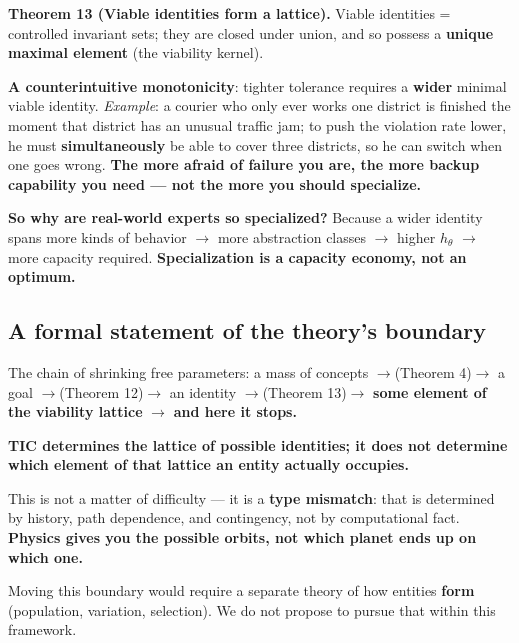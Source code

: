 \documentclass[11pt]{article}
\renewenvironment{quote}
  {\def\FrameCommand{{\color{gray!60}\vrule width 2pt}\hspace{8pt}}%
   \MakeFramed{\advance\hsize-\width \FrameRestore}\begin{itshape}}
  {\end{itshape}\endMakeFramed}
\begin{document}
\begin{quote}
\textbf{Theorem 13 (Viable identities form a lattice).} Viable identities = controlled invariant sets; they are closed under union, and so possess a \textbf{unique maximal element} (the viability kernel).

\textbf{A counterintuitive monotonicity}: tighter tolerance requires a \textbf{wider} minimal viable identity. \emph{Example}: a courier who only ever works one district is finished the moment that district has an unusual traffic jam; to push the violation rate lower, he must \textbf{simultaneously} be able to cover three districts, so he can switch when one goes wrong. \textbf{The more afraid of failure you are, the more backup capability you need --- not the more you should specialize.}

\textbf{So why are real-world experts so specialized?} Because a wider identity spans more kinds of behavior \(\rightarrow\) more abstraction classes \(\rightarrow\) higher \(h_\theta\) \(\rightarrow\) more capacity required. \textbf{Specialization is a capacity economy, not an optimum.}
\end{quote}

\hypertarget{a-formal-statement-of-the-theorys-boundary}{%
\subsection{A formal statement of the theory's boundary}\label{a-formal-statement-of-the-theorys-boundary}}

The chain of shrinking free parameters: a mass of concepts \(\rightarrow\)(Theorem 4)\(\rightarrow\) a goal \(\rightarrow\)(Theorem 12)\(\rightarrow\) an identity \(\rightarrow\)(Theorem 13)\(\rightarrow\) \textbf{some element of the viability lattice} \(\rightarrow\) \textbf{and here it stops.}

\begin{quote}
\textbf{TIC determines the lattice of possible identities; it does not determine which element of that lattice an entity actually occupies.}

This is not a matter of difficulty --- it is a \textbf{type mismatch}: that is determined by history, path dependence, and contingency, not by computational fact. \textbf{Physics gives you the possible orbits, not which planet ends up on which one.}
\end{quote}

Moving this boundary would require a separate theory of how entities \textbf{form} (population, variation, selection). We do not propose to pursue that within this framework.
\end{document}
